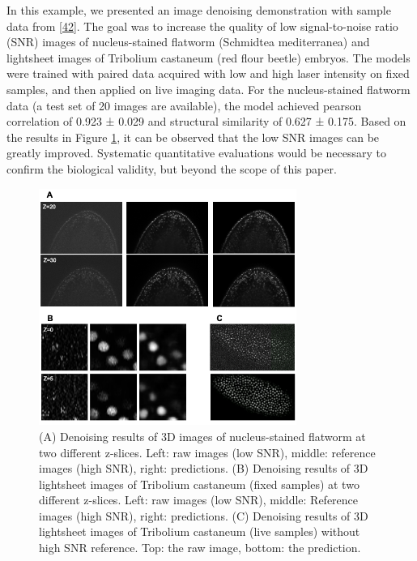 In this example, we presented an image denoising demonstration with sample data from {[}\protect\hyperlink{ref-12G712Zky}{42}{]}. The goal was to increase the quality of low signal-to-noise ratio (SNR) images of nucleus-stained flatworm (Schmidtea mediterranea) and lightsheet images of Tribolium castaneum (red flour beetle) embryos. The models were trained with paired data acquired with low and high laser intensity on fixed samples, and then applied on live imaging data. For the nucleus-stained flatworm data (a test set of 20 images are available), the model achieved pearson correlation of 0.923 ± 0.029 and structural similarity of 0.627 ± 0.175. Based on the results in Figure \ref{fig:denoising}, it can be observed that the low SNR images can be greatly improved. Systematic quantitative evaluations would be necessary to confirm the biological validity, but beyond the scope of this paper.

\begin{figure}
\hypertarget{fig:denoising}{%
\centering
\includegraphics[width=0.75\textwidth,height=\textheight]{images/denoising.png}
\caption{(A) Denoising results of 3D images of nucleus-stained flatworm at two different z-slices. Left: raw images (low SNR), middle: reference images (high SNR), right: predictions. (B) Denoising results of 3D lightsheet images of Tribolium castaneum (fixed samples) at two different z-slices. Left: raw images (low SNR), middle: Reference images (high SNR), right: predictions. (C) Denoising results of 3D lightsheet images of Tribolium castaneum (live samples) without high SNR reference. Top: the raw image, bottom: the prediction.}\label{fig:denoising}
}
\end{figure}

